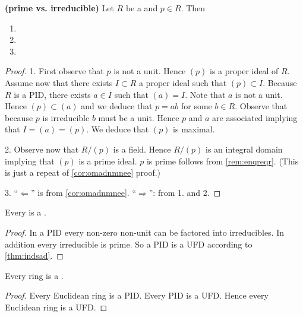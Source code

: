 \documentclass{article}
\newcommand{\bfs}[1]{\textbf{({#1}) }}
\begin{document}
 \begin{thma}\bfs{prime vs. irreducible}\label{thm:oindnane}
 Let $R$ be a  and $p \in R$. Then 
 \begin{enumerate}
 \item {}
        \item {}
             \item {}
 \end{enumerate}
 
 \centerline{}
 \end{thma}
\begin{proof}
1. %
First observe that $p$ is not a unit. Hence $(p)$ is a proper ideal of $R$. Assume now that there exists $I \subset R$ a proper ideal such that $(p) \subset I$. Because $R$ is a PID, there exists $a \in I$ such that $(a)=I$. Note that $a$ is not a unit. Hence $(p) \subset(a)$ and we deduce that $p=a b$ for some $b \in R$. Observe that because $p$ is irreducible $b$ must be a unit. Hence $p$ and $a$ are associated implying that $I=(a)=(p)$. We deduce that $(p)$ is maximal.


2. Observe now that $R /(p)$ is a field. Hence $R /(p)$ is an integral domain implying that $(p)$ is a prime ideal. $p$ is prime follows from \cref{rem:enqreqr}. (This is just a repeat of  \cref{cor:omadnmnee} proof.)

3. ``$\Longleftarrow$'' is from \cref{cor:omadnmnee}. ``$\Longrightarrow$'': from 1. and 2.
\end{proof}

\begin{thma}
Every  is a .
\end{thma}
\begin{proof}
 In a PID every non-zero non-unit can be factored into irreducibles. In addition every irreducible is prime. So a PID is a UFD according to \cref{thm:indsad}.
\end{proof}
\begin{thma}
Every  ring is a .
\end{thma}
\begin{proof}
 Every Euclidean ring is a PID. Every PID is a UFD. Hence every Euclidean ring is a UFD.
\end{proof}
\end{document}
